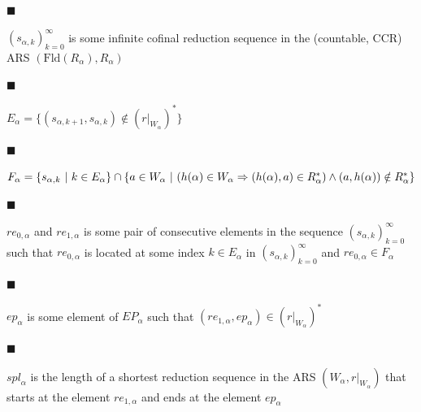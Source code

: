 \documentclass[10pt,a4paper]{amsart}
\begin{document}
 
 
\par\noindent  $\blacksquare$ 
 
$(s_{\alpha,k})_{k=0}^{\infty}$ is some infinite cofinal reduction sequence in the (countable, CCR) ARS $(\mathrm{Fld}(R_{\alpha}),R_{\alpha})$\par
 
 
 
\par\noindent  $\blacksquare$ 
 
$E_{\alpha}=\{(s_{\alpha,k+1},s_{\alpha,k})\notin(r|_{W_{\alpha}})^{*}\}$\par
 
 
 
\par\noindent  $\blacksquare$ 
 
$F_{\alpha}=\{s_{\alpha,k}\leavevmode\nobreak\ |\leavevmode\nobreak\ k\in E_{%
\alpha}\}\cap\{a\in W_{\alpha}\leavevmode\nobreak\ |\leavevmode\nobreak\ (h(%
\alpha)\in W_{\alpha}\Rightarrow(h(\alpha),a)\in R_{\alpha}^{*})\wedge(a,h(%
\alpha))\notin R_{\alpha}^{*}\}$\par
 
 
 
\par\noindent  $\blacksquare$ 
 
$re_{0,\alpha}$ and $re_{1,\alpha}$ is some pair of consecutive elements in the sequence $(s_{\alpha,k})_{k=0}^{\infty}$ such that $re_{0,\alpha}$ is located at some index $k\in E_{\alpha}$ in $(s_{\alpha,k})_{k=0}^{\infty}$ and $re_{0,\alpha}\in F_{\alpha}$\par
 
 
 
\par\noindent  $\blacksquare$ 
 
$ep_{\alpha}$ is some element of $EP_{\alpha}$ such that $(re_{1,\alpha},ep_{\alpha})\in(r|_{W_{\alpha}})^{*}$\par
 
 
 
\par\noindent  $\blacksquare$ 
 
${spl}_{\alpha}$ is the length of a shortest reduction sequence in the ARS $(W_{\alpha},r|_{W_{\alpha}})$ that starts at the element ${re}_{1,\alpha}$ and ends at the element ${ep}_{\alpha}$\par
 
\end{document}
